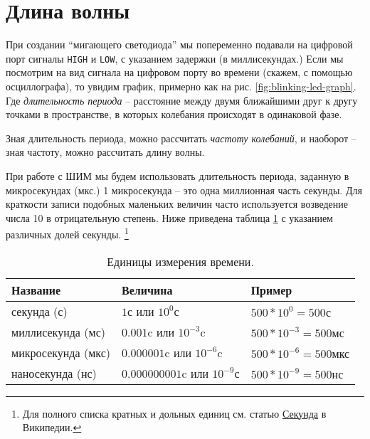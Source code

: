\documentclass[../sparc.tex]{subfiles}
\begin{document}
\section{Длина волны}

При создании ``мигающего светодиода'' мы попеременно подавали на цифровой порт
сигналы \texttt{HIGH} и \texttt{LOW}, с указанием задержки (в миллисекундах.)
Если мы посмотрим на вид сигнала на цифровом порту во времени (скажем, с помощью
осциллографа), то увидим график, примерно как на
рис. \ref{fig:blinking-led-graph}.  Где \emph{длительность периода} -- расстояние
между двумя ближайшими друг к другу точками в пространстве, в которых колебания
происходят в одинаковой фазе.


Зная длительность периода, можно рассчитать \emph{частоту колебаний}, и наоборот
-- зная частоту, можно рассчитать длину волны.

При работе с \gls{ШИМ} мы будем использовать длительность периода, заданную в
микросекундах (мкс.)  1 микросекунда -- это одна миллионная часть секунды. Для
краткости записи подобных маленьких величин часто используется возведение числа
10 в отрицательную степень.  Ниже приведена таблица \ref{table:timescale-units}
с указанием различных долей секунды. \footnote{Для полного списка кратных и
дольных единиц см. статью
\href{https://ru.wikipedia.org/wiki/\%D0\%A1\%D0\%B5\%D0\%BA\%D1\%83\%D0\%BD\%D0\%B4\%D0\%B0}{Секунда}
в Википедии.}

\begin{table}[H]
  \begin{tabular}{p{3cm}|p{4cm}|p{3cm}}
    Название & Величина & Пример \\
    \hline \hline
    секунда (с) & $ 1 \mbox{с} $ или $ 10^0 \mbox{с} $ & $ 500 * 10^{0} = 500 \mbox{с} $ \\
    \hline
    миллисекунда (мс) & $ 0.001 \mbox{c} $ или $ 10^{-3} \mbox{c} $ & $ 500 * 10^{-3} = 500 \mbox{мс} $ \\
    \hline
    микросекунда (мкс) & $ 0.000001 \mbox{c} $ или $ 10^{-6} \mbox{c} $ & $ 500 * 10^{-6} = 500 \mbox{мкс} $ \\
    \hline
    наносекунда (нс) & $ 0.000000001 \mbox{c} $ или $ 10^{-9} \mbox{с} $ & $ 500 * 10^{-9} = 500 \mbox{нс} $
  \end{tabular}
  \caption{Единицы измерения времени.}
  \label{table:timescale-units}
\end{table}
\end{document}
